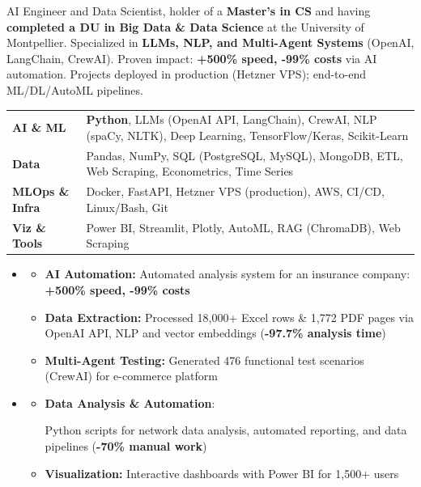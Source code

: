 \documentclass[11pt,a4paper]{article}
\renewcommand{\itemspace}{\vspace{0.25em}}
\begin{document}

\noindent
AI Engineer and Data Scientist, holder of a \textbf{Master's in CS} and having \textbf{completed a DU in Big Data \& Data Science} at the University of Montpellier. Specialized in \textbf{LLMs, NLP, and Multi-Agent Systems} (OpenAI, LangChain, CrewAI). Proven impact: \textbf{+500\% speed, -99\% costs} via AI automation. Projects deployed in production (Hetzner VPS); end-to-end ML/DL/AutoML pipelines.

\noindent
\begin{tabularx}{\linewidth}{@{} p{3.2cm} X @{}}
\textbf{AI \& ML} & \textbf{Python}, LLMs (OpenAI API, LangChain), CrewAI, NLP (spaCy, NLTK), Deep Learning, TensorFlow/Keras, Scikit-Learn \\
\textbf{Data} & Pandas, NumPy, SQL (PostgreSQL, MySQL), MongoDB, ETL, Web Scraping, Econometrics, Time Series \\
\textbf{MLOps \& Infra} & Docker, FastAPI, Hetzner VPS (production), AWS, CI/CD, Linux/Bash, Git \\
\textbf{Viz \& Tools} & Power BI, Streamlit, Plotly, AutoML, RAG (ChromaDB), Web Scraping \\
\end{tabularx}

\begin{itemize}[leftmargin=1em, label={}]
    \item
    \begin{itemize}[leftmargin=1.5em, label={\textbullet}, nosep]
        \item \textbf{AI Automation:} Automated analysis system for an insurance company: \textbf{+500\% speed, -99\% costs}
        \item \textbf{Data Extraction:} Processed 18,000+ Excel rows \& 1,772 PDF pages via OpenAI API, NLP and vector embeddings (\textbf{-97.7\% analysis time})
        \item \textbf{Multi-Agent Testing:} Generated 476 functional test scenarios (CrewAI) for e-commerce platform
    \end{itemize}

    \itemspace
    \item
    \begin{itemize}[leftmargin=1.5em, label={\textbullet}, nosep]
        \item \textbf{Data Analysis \& Automation}: \raggedright Python scripts for network data analysis, automated reporting, and data pipelines (\textbf{-70\% manual work})
        \item \textbf{Visualization:} Interactive dashboards with Power BI for 1,500+ users
    \end{itemize}
\end{itemize}
\end{document}

